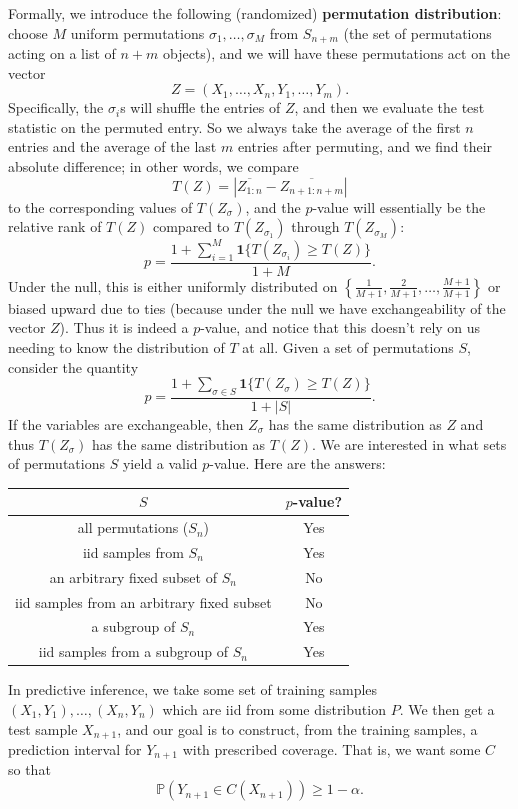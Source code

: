 Formally, we introduce the following (randomized) \textbf{permutation distribution}: choose $M$ uniform permutations $\sigma_1, \ldots, \sigma_M$ from $S_{n+m}$ (the set of permutations acting on a list of $n + m$ objects), and we will have these permutations act on the vector
\[
Z = (X_1, \ldots, X_n, Y_1, \ldots, Y_m).
\]
Specifically, the $\sigma_i$s will shuffle the entries of $Z$, and then we evaluate the test statistic on the permuted entry. So we always take the average of the first $n$ entries and the average of the last $m$ entries after permuting, and we find their absolute difference; in other words, we compare
\[
T(Z) = \left|\overline{Z_{1:n}} - \overline{Z_{n+1:n+m}}\right|
\]
to the corresponding values of $T(Z_\sigma)$, and the $p$-value will essentially be the relative rank of $T(Z)$ compared to $T(Z_{\sigma_1})$ through $T(Z_{\sigma_M})$:
\[
p = \frac{1 + \sum_{i=1}^{M} \mathbf{1}\{T(Z_{\sigma_i}) \geq T(Z)\}}{1 + M}.
\]
Under the null, this is either uniformly distributed on $\left\{\frac{1}{M+1}, \frac{2}{M+1}, \ldots, \frac{M+1}{M+1}\right\}$ or biased upward due to ties (because under the null we have exchangeability of the vector $Z$). Thus it is indeed a $p$-value, and notice that this doesn't rely on us needing to know the distribution of $T$ at all.
Given a set of permutations $S$, consider the quantity
\[
p = \frac{1 + \sum_{\sigma \in S} \mathbf{1}\{T(Z_\sigma) \geq T(Z)\}}{1 + |S|}.
\]
If the variables are exchangeable, then $Z_\sigma$ has the same distribution as $Z$ and thus $T(Z_\sigma)$ has the same distribution as $T(Z)$. We are interested in what sets of permutations $S$ yield a valid $p$-value.
Here are the answers:
\begin{center}
\begin{tabular}{c|c}
$S$ & $p$-value? \\
\hline
all permutations ($S_n$) & Yes \\
iid samples from $S_n$ & Yes \\
an arbitrary fixed subset of $S_n$ & No \\
iid samples from an arbitrary fixed subset & No \\
a subgroup of $S_n$ & Yes \\
iid samples from a subgroup of $S_n$ & Yes \\
\end{tabular}
\end{center}

\begin{exam}
In predictive inference, we take some set of training samples $(X_1, Y_1), \ldots, (X_n, Y_n)$ which are iid from some distribution $P$. We then get a test sample $X_{n+1}$, and our goal is to construct, from the training samples, a prediction interval for $Y_{n+1}$ with prescribed coverage. That is, we want some $C$ so that
\[
\mathbb{P}(Y_{n+1} \in C(X_{n+1})) \geq 1 - \alpha.
\]
\end{exam}

